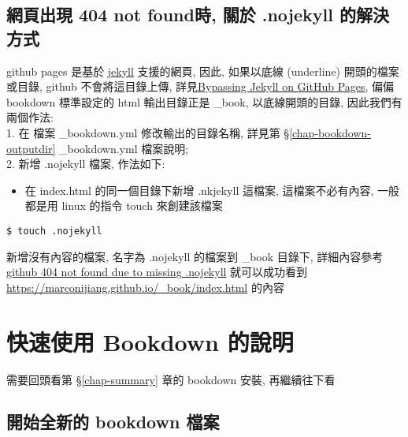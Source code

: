 \documentclass[
]{book}
\providecommand{\tightlist}{%
  \setlength{\itemsep}{0pt}\setlength{\parskip}{0pt}}
\begin{document}
\hypertarget{ux7db2ux9801ux51faux73fe-404-not-foundux6642-ux95dcux65bc-.nojekyll-ux7684ux89e3ux6c7aux65b9ux5f0f}{%
\section{網頁出現 404 not found時, 關於 .nojekyll 的解決方式}\label{ux7db2ux9801ux51faux73fe-404-not-foundux6642-ux95dcux65bc-.nojekyll-ux7684ux89e3ux6c7aux65b9ux5f0f}}

github pages 是基於 \href{https://jekyllrb.com/docs/github-pages/}{jekyll} 支援的網頁, 因此, 如果以底線 (underline) 開頭的檔案或目錄, github 不會將這目錄上傳, 詳見\href{https://github.blog/2009-12-29-bypassing-jekyll-on-github-pages/}{Bypassing Jekyll on GitHub Pages}, 偏偏 bookdown 標準設定的 html 輸出目錄正是 \_book, 以底線開頭的目錄, 因此我們有兩個作法:\\
1. 在 檔案 \_bookdown.yml 修改輸出的目錄名稱, 詳見第 §\ref{chap-bookdown-outputdir} \_bookdown.yml 檔案說明;\\
2. 新增 .nojekyll 檔案, 作法如下:

\begin{itemize}
\tightlist
\item
  在 index.html 的同一個目錄下新增 .nkjekyll 這檔案, 這檔案不必有內容, 一般都是用 linux 的指令 touch 來創建該檔案
\end{itemize}

\begin{verbatim}
$ touch .nojekyll
\end{verbatim}

新增沒有內容的檔案, 名字為 .nojekyll 的檔案到 \_book 目錄下, 詳細內容參考 \href{https://stackoverflow.com/questions/11577147/how-to-fix-http-404-on-github-pages}{github 404 not found due to missing .nojekyll} 就可以成功看到 \url{https://marconijiang.github.io/_book/index.html} 的內容

\hypertarget{chap-bookdown}{%
\chapter{快速使用 Bookdown 的說明}\label{chap-bookdown}}

需要回頭看第 §\ref{chap-summary} 章的 bookdown 安裝, 再繼續往下看

\hypertarget{ux958bux59cbux5168ux65b0ux7684-bookdown-ux6a94ux6848}{%
\section{開始全新的 bookdown 檔案}\label{ux958bux59cbux5168ux65b0ux7684-bookdown-ux6a94ux6848}}
\end{document}
